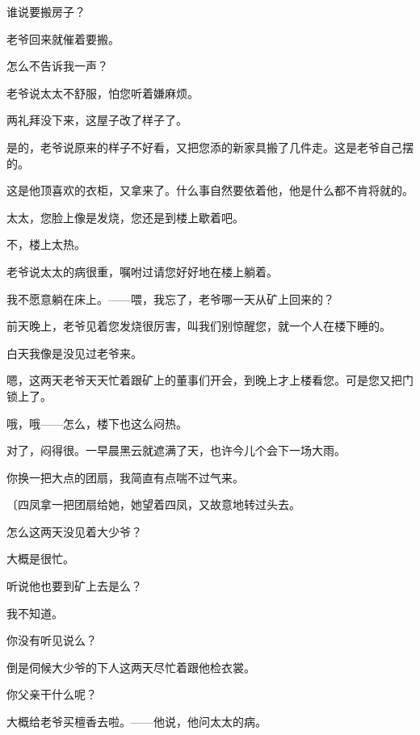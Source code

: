 谁说要搬房子？

老爷回来就催着要搬。

怎么不告诉我一声？

老爷说太太不舒服，怕您听着嫌麻烦。

两礼拜没下来，这屋子改了样子了。

是的，老爷说原来的样子不好看，又把您添的新家具搬了几件走。这是老爷自己摆的。

这是他顶喜欢的衣柜，又拿来了。什么事自然要依着他，他是什么都不肯将就的。

太太，您脸上像是发烧，您还是到楼上歇着吧。

不，楼上太热。

老爷说太太的病很重，嘱咐过请您好好地在楼上躺着。

我不愿意躺在床上。——喂，我忘了，老爷哪一天从矿上回来的？

前天晚上，老爷见着您发烧很厉害，叫我们别惊醒您，就一个人在楼下睡的。

白天我像是没见过老爷来。

嗯，这两天老爷天天忙着跟矿上的董事们开会，到晚上才上楼看您。可是您又把门锁上了。

哦，哦——怎么，楼下也这么闷热。

对了，闷得很。一早晨黑云就遮满了天，也许今儿个会下一场大雨。

你换一把大点的团扇，我简直有点喘不过气来。

{\fangsong〔四凤拿一把团扇给她，她望着四凤，又故意地转过头去。}

怎么这两天没见着大少爷？

大概是很忙。

听说他也要到矿上去是么？

我不知道。

你没有听见说么？

倒是伺候大少爷的下人这两天尽忙着跟他检衣裳。

你父亲干什么呢？

大概给老爷买檀香去啦。——他说，他问太太的病。

